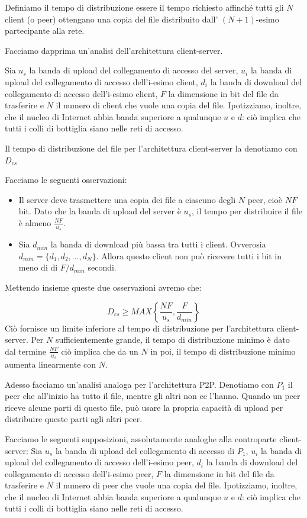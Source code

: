 \documentclass{book}
\begin{document}
Definiamo il tempo di distribuzione essere il tempo richiesto affinché tutti gli $N$ client (o peer) ottengano una copia del file distribuito dall' $(N+1)$-esimo partecipante alla rete.

Facciamo dapprima un'analisi dell'architettura client-server.

Sia $u_{s}$ la banda di upload del collegamento di accesso del server, $u_{i}$ la banda di upload del collegamento di accesso dell'i-esimo client, $d_{i}$ la banda di download del collegamento di accesso dell'i-esimo client, $F$ la dimensione in bit del file da trasferire e $N$ il numero di client che vuole una copia del file. Ipotizziamo, inoltre, che il nucleo di Internet abbia banda superiore a qualunque $u$ e $d$: ciò implica che tutti i colli di bottiglia siano nelle reti di accesso.

Il tempo di distribuzione del file per l'architettura client-server la denotiamo con $D_{cs}$

Facciamo le seguenti osservazioni:

\begin{itemize}
	\item Il server deve trasmettere una copia dei file a ciascuno degli $N$ peer, cioè $NF$ bit. Dato che la banda di upload del server è $u_{s}$, il tempo per distribuire il file è almeno $\frac{NF}{u_{s}}$.
	\item Sia $d_{min}$ la banda di download più bassa tra tutti i client. Ovverosia $d_{min} = \{d_{1}, d_{2}, ..., d_{N}\}$. Allora questo client non può ricevere tutti i bit in meno di di $F/d_{min}$ secondi.
\end{itemize}

Mettendo insieme queste due osservazioni avremo che:

$$ D_{cs} \geq MAX\left\{ \frac{NF}{u_{s}}, \frac{F}{d_{min}} \right \} $$
Ciò fornisce un limite inferiore al tempo di distribuzione per l'architettura client-server. Per $N$ sufficientemente grande, il tempo di distribuzione minimo è dato dal termine $\frac{NF}{u_{s}}$ ciò implica che da un $N$ in poi, il tempo di distribuzione minimo aumenta linearmente con $N$.

Adesso facciamo un'analisi analoga per l'architettura P2P. Denotiamo con $P_{1}$ il peer che all'inizio ha tutto il file, mentre gli altri non ce l'hanno. Quando un peer riceve alcune parti di questo file, può usare la propria capacità di upload per distribuire queste parti agli altri peer.

Facciamo le seguenti supposizioni, assolutamente analoghe alla controparte client-server:
Sia $u_{s}$ la banda di upload del collegamento di accesso di $P_{1}$, $u_{i}$ la banda di upload del collegamento di accesso dell'i-esimo peer, $d_{i}$ la banda di download del collegamento di accesso dell'i-esimo peer, $F$ la dimensione in bit del file da trasferire e $N$ il numero di peer che vuole una copia del file. Ipotizziamo, inoltre, che il nucleo di Internet abbia banda superiore a qualunque $u$ e $d$: ciò implica che tutti i colli di bottiglia siano nelle reti di accesso.
\end{document}
